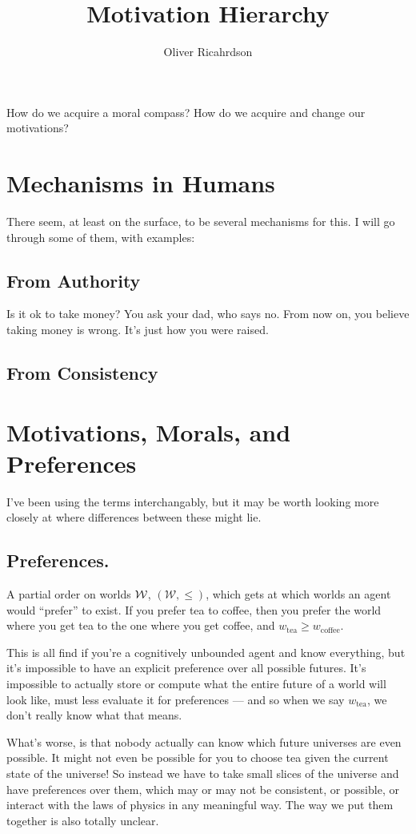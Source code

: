 \documentclass{article}
\title{Motivation Hierarchy}
\author{Oliver Ricahrdson}
\begin{document}
	\maketitle	
	
	How do we acquire a moral compass? How do we acquire and change our motivations? 
	
	
	\section{Mechanisms in Humans}
	There seem, at least on the surface, to be several mechanisms for this. I will go through some of them, with examples:
	
	\subsection{From Authority}
	Is it ok to take money? You ask your dad, who says no. From now on, you believe taking money is wrong. It's just how you were raised.
	
	\subsection{From Consistency}
	
	\section{Motivations, Morals, and Preferences}
	I've been using the terms interchangably, but it may be worth looking more closely at where differences between these might lie. 
	
	\subsection{Preferences.} A partial order on worlds $\cal W$, $(\mathcal W, \leq)$, which gets at which worlds an agent would ``prefer'' to exist. If you prefer tea to coffee, then you prefer the world where you get tea to the one where you get coffee, and $w_{\text{tea}} \geq w_{\text{coffee}}$. 
	
	This is all find if you're a cognitively unbounded agent and know everything, but it's impossible to have an explicit preference over all possible futures. It's impossible to actually store or compute what the entire future of a world will look like, must less evaluate it for preferences --- and so when we say $w_{\text{tea}}$, we don't really know what that means.
	
	What's worse, is that nobody actually can know which future universes are even possible. It might not even be possible for you to choose tea given the current state of the universe! So instead we have to take small slices of the universe and have preferences over them, which may or may not be consistent, or possible, or interact with the laws of physics in any meaningful way. The way we put them together is also totally unclear. 
	
\end{document}
